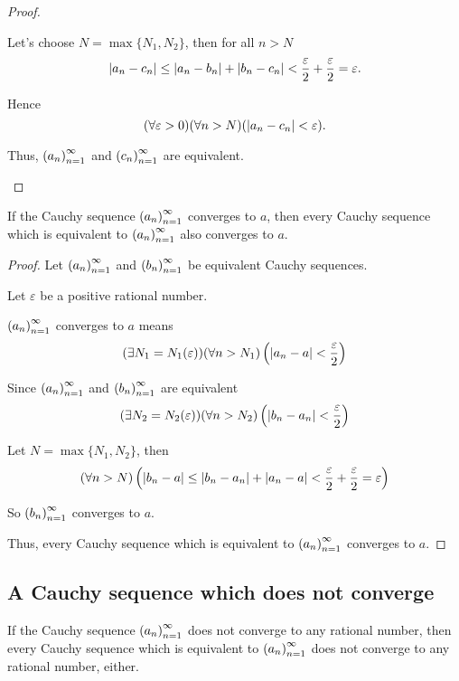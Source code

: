 \begin{proof}
\begin{itemize}
              Let's choose $N = \max\{ N_{1}, N_{2} \}$, then for all $n > N$
              \[
                  \left\vert{a_{n} - c_{n}}\right\vert \le \left\vert{a_{n} - b_{n}}\right\vert + \left\vert{b_{n} - c_{n}}\right\vert < \frac{\varepsilon}{2} + \frac{\varepsilon}{2} = \varepsilon.
              \]

              Hence
              \[
                  (\forall\varepsilon > 0)(\forall n > N)(\left\vert{a_{n} - c_{n}}\right\vert < \varepsilon).
              \]

              Thus, ${\left({a_{n}}\right)}^{\infty}_{n=1}$ and ${\left({c_{n}}\right)}^{\infty}_{n=1}$ are equivalent.
    \end{itemize}
\end{proof}

\begin{theorem}
    If the Cauchy sequence ${\left({a_{n}}\right)}^{\infty}_{n=1}$ converges to $a$, then every Cauchy sequence which is equivalent to ${\left({a_{n}}\right)}^{\infty}_{n=1}$ also converges to $a$.
\end{theorem}

\begin{proof}
    Let ${\left({a_{n}}\right)}^{\infty}_{n=1}$ and ${\left({b_{n}}\right)}^{\infty}_{n=1}$ be equivalent Cauchy sequences.

    Let $\varepsilon$ be a positive rational number.

    ${\left({a_{n}}\right)}^{\infty}_{n=1}$ converges to $a$ means
    \[
        (\exists N_{1}=N_{1}(\varepsilon))(\forall n > N_{1})\left(\left\vert{a_{n} - a}\right\vert < \frac{\varepsilon}{2}\right)
    \]

    Since ${\left({a_{n}}\right)}^{\infty}_{n=1}$ and ${\left({b_{n}}\right)}^{\infty}_{n=1}$ are equivalent
    \[
        (\exists N_{2}=N_{2}(\varepsilon))(\forall n > N_{2})\left(\left\vert{b_{n} - a_{n}}\right\vert < \frac{\varepsilon}{2}\right)
    \]

    Let $N = \max\{ N_{1}, N_{2} \}$, then
    \[
        (\forall n > N)\left(\left\vert{b_{n} - a}\right\vert \le \left\vert{b_{n} - a_{n}}\right\vert + \left\vert{a_{n} - a}\right\vert < \frac{\varepsilon}{2} + \frac{\varepsilon}{2} = \varepsilon\right)
    \]

    So ${\left({b_{n}}\right)}^{\infty}_{n=1}$ converges to $a$.

    Thus, every Cauchy sequence which is equivalent to ${\left({a_{n}}\right)}^{\infty}_{n=1}$ converges to $a$.
\end{proof}

\subsection{A Cauchy sequence which does not converge}

\begin{theorem}
    If the Cauchy sequence ${\left({a_{n}}\right)}^{\infty}_{n=1}$ does not converge to any rational number, then every Cauchy sequence which is equivalent to ${\left({a_{n}}\right)}^{\infty}_{n=1}$ does not converge to any rational number, either.
\end{theorem}

